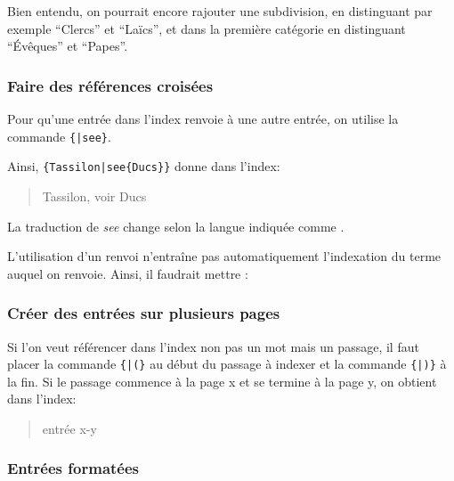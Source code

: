 Bien entendu, on pourrait encore rajouter une subdivision, en distinguant par exemple \enquote{Clercs} et \enquote{Laïcs}, et dans la première catégorie en distinguant \enquote{Évêques} et \enquote{Papes}. 


 
\subsubsection{Faire des références croisées}

Pour qu'une entrée dans l'index renvoie à une autre entrée, on utilise la commande  \verb|{|\verb+|see+\verb|}|. 

Ainsi,  \verb+{Tassilon|see{Ducs}}+ donne dans l'index:

\begin{quotation}
Tassilon, voir Ducs
\end{quotation}
La traduction de \emph{see} change selon la langue indiquée comme . 


\begin{attention}
L'utilisation d'un renvoi n'entraîne pas automatiquement l'indexation du terme auquel on renvoie.
Ainsi, il faudrait mettre :
\begin{latexcode}
\end{latexcode}
\end{attention}
  

\subsubsection{Créer des entrées sur plusieurs pages}

Si l'on veut référencer dans l'index non pas un mot mais un passage, il faut placer la commande \verb|{|\verb+|(}+ au début du passage à indexer et la commande  \verb|{|\verb+|)}+ à la fin. Si le passage commence à la page x et se termine à la page y, on obtient dans l'index: 

\begin{quotation}
entrée x-y
\end{quotation}


\subsubsection{Entrées formatées}

